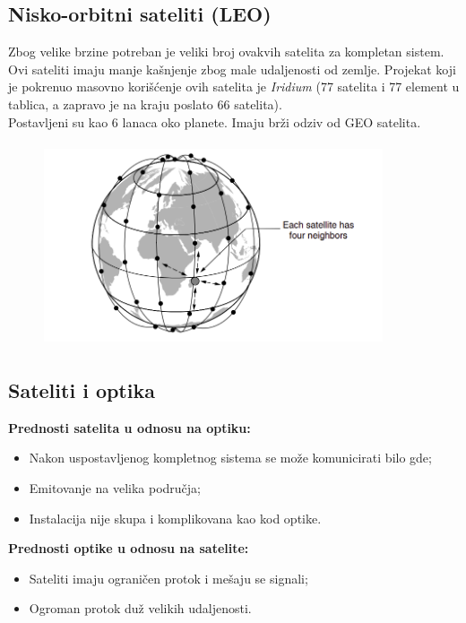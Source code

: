 \documentclass[a4paper]{article}
\begin{document}
        \subsection{Nisko-orbitni sateliti (LEO)}
            Zbog velike brzine potreban je veliki broj ovakvih satelita za kompletan sistem. Ovi 
            sateliti imaju manje kašnjenje zbog male udaljenosti od zemlje. Projekat koji je pokrenuo
            masovno korišćenje ovih satelita je \textit{Iridium} (77 satelita i 77 element u tablica, a
            zapravo je na kraju poslato 66 satelita). \\
            \indent Postavljeni su kao 6 lanaca oko planete. Imaju brži odziv od GEO satelita.
            \begin{figure}[H]
                \begin{center}
                    \includegraphics[width=100mm,height=60mm]{Slike/leo.png}
                \end{center}
            \end{figure}
        \subsection{Sateliti i optika}
            \noindent \textbf{Prednosti satelita u odnosu na optiku:}
            \begin{itemize}
                \item Nakon uspostavljenog kompletnog sistema se može komunicirati bilo gde;
                \item Emitovanje na velika područja;
                \item Instalacija nije skupa i komplikovana kao kod optike.
            \end{itemize}
            \textbf{Prednosti optike u odnosu na satelite:}
            \begin{itemize}
                \item Sateliti imaju ograničen protok i mešaju se signali;
                \item Ogroman protok duž velikih udaljenosti.
            \end{itemize}
\end{document}
